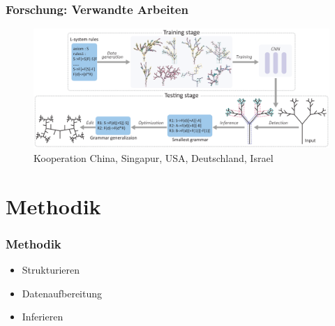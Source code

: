 \documentclass[12pt]{beamer}
\begin{document}
    \begin{frame}
        \frametitle{Forschung: Verwandte Arbeiten}

        \begin{figure}
            \centering
            \includegraphics[width=12cm]{../images/guo_2020_system.PNG}
            \caption{Kooperation China, Singapur, USA, Deutschland, Israel~\cite{ref_4}}
        \end{figure}
    \end{frame}

    \section{Methodik}
    \label{sec:methodik}
    \begin{frame}
        \frametitle{Methodik}

        \begin{itemize}
            \setlength\itemsep{1em}
            \item<1-> Strukturieren
            \item<2-> Datenaufbereitung
            \item<3-> Inferieren
        \end{itemize}
    \end{frame}
\end{document}
